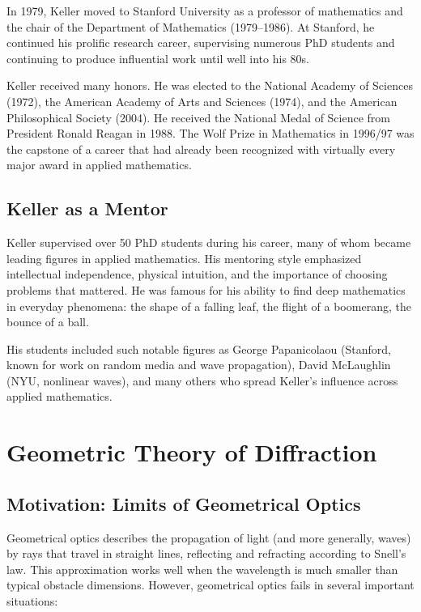In 1979, Keller moved to Stanford University as a professor of mathematics and the chair of the Department of Mathematics (1979--1986). At Stanford, he continued his prolific research career, supervising numerous PhD students and continuing to produce influential work until well into his 80s.

Keller received many honors. He was elected to the National Academy of Sciences (1972), the American Academy of Arts and Sciences (1974), and the American Philosophical Society (2004). He received the National Medal of Science from President Ronald Reagan in 1988. The Wolf Prize in Mathematics in 1996/97 was the capstone of a career that had already been recognized with virtually every major award in applied mathematics.

\subsection{Keller as a Mentor}

Keller supervised over 50 PhD students during his career, many of whom became leading figures in applied mathematics. His mentoring style emphasized intellectual independence, physical intuition, and the importance of choosing problems that mattered. He was famous for his ability to find deep mathematics in everyday phenomena: the shape of a falling leaf, the flight of a boomerang, the bounce of a ball.

His students included such notable figures as George Papanicolaou (Stanford, known for work on random media and wave propagation), David McLaughlin (NYU, nonlinear waves), and many others who spread Keller's influence across applied mathematics.

\section{Geometric Theory of Diffraction}

\subsection{Motivation: Limits of Geometrical Optics}

Geometrical optics describes the propagation of light (and more generally, waves) by rays that travel in straight lines, reflecting and refracting according to Snell's law. This approximation works well when the wavelength is much smaller than typical obstacle dimensions. However, geometrical optics fails in several important situations:


